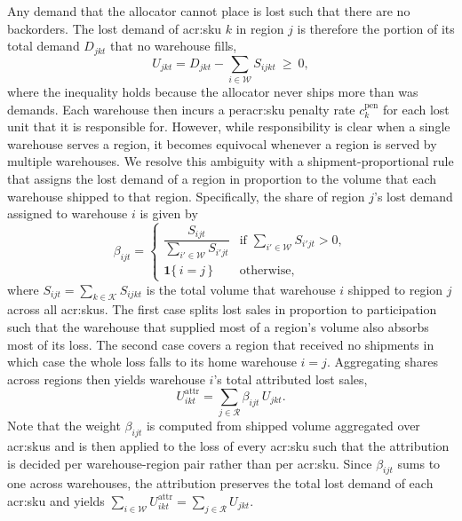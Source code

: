 Any demand that the allocator cannot place is lost such that there are no backorders. The lost demand of \gls{acr:sku} $k$ in region $j$ is therefore the portion of its total demand $D_{jkt}$ that no warehouse fills,
\begin{equation}
\label{eq:lost-sales}
  U_{jkt} = D_{jkt} - \sum_{i \in \mathcal{W}} S_{ijkt} \ \ge\ 0,
\end{equation}
where the inequality holds because the allocator never ships more than was demands. Each warehouse then incurs a per\gls{acr:sku} penalty rate $c^{\mathrm{pen}}_k$ for each lost unit that it is responsible for. However, while responsibility is clear when a single warehouse serves a region, it becomes equivocal whenever a region is served by multiple warehouses. We resolve this ambiguity with a shipment-proportional rule that assigns the lost demand of a region in proportion to the volume that each warehouse shipped to that region. 
Specifically, the share of region $j$'s lost demand assigned to warehouse $i$  is given by 
\begin{equation}
\label{eq:attribution-weight}
  \beta_{ijt} =
  \begin{cases}
    \dfrac{S_{ijt}}{\sum_{i' \in \mathcal{W}} S_{i'jt}} & \text{if } \sum_{i' \in \mathcal{W}} S_{i'jt} > 0, \\[2.2ex]
    \mathbf{1}\{\,i = j\,\} & \text{otherwise,}
  \end{cases}
\end{equation}
where $S_{ijt} = \sum_{k \in \mathcal{K}} S_{ijkt}$ is the total volume that warehouse $i$ shipped to region $j$ across all \glspl{acr:sku}. The first case splits lost sales in proportion to participation such that the warehouse that supplied most of a region's volume also absorbs most of its loss. The second case covers a region that received no shipments in which case the whole loss falls to its home warehouse $i=j$. 
Aggregating shares across regions then yields warehouse $i$'s total attributed lost sales, 
\begin{equation}
\label{eq:attributed-lost-sales}
  U^{\mathrm{attr}}_{ikt} = \sum_{j \in \mathcal{R}} \beta_{ijt}\, U_{jkt}.
\end{equation}
Note that the weight $\beta_{ijt}$ is computed from shipped volume aggregated over \glspl{acr:sku} and is then applied to the loss of every \gls{acr:sku} such that the attribution is decided per warehouse-region pair rather than per \gls{acr:sku}.
Since $\beta_{ijt}$ sums to one across warehouses, the attribution preserves the total lost demand of each \gls{acr:sku} and yields $\sum_{i \in \mathcal{W}} U^{\mathrm{attr}}_{ikt} = \sum_{j \in \mathcal{R}} U_{jkt}$.\\

